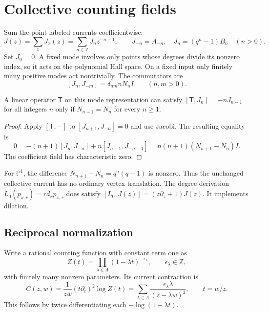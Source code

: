 \section{Collective counting fields}
\label{v4-arith:curve:sec:counting}

Sum the point-labeled currents coefficientwise:
\[
 J(z)=\sum_xJ_x(z)=\sum_{n\in\mathbb Z}J_nz^{-n-1},
 \qquad J_{-n}=A_{-n},\quad J_n=(q^n-1)B_n\quad(n>0).
\]
Set $J_0=0$. A fixed mode involves only points whose degrees divide
its nonzero index, so it acts on the polynomial Hall space.
On a fixed input only finitely many positive modes act nontrivially.
The commutators are
\begin{equation}\label{v4-arith:curve:eq:counting-commutator}
 [J_n,J_{-m}]=\delta_{nm}nN_nI\qquad(n,m>0).
\end{equation}

\begin{proposition}\label{v4-arith:curve:prop:translation}
A linear operator $\mathsf T$ on this mode representation can
satisfy $[\mathsf T,J_n]=-nJ_{n-1}$ for all integers $n$ only if
$N_{n+1}=N_n$ for every $n\geq1$.
\end{proposition}
\begin{proof}
Apply $[\mathsf T,-]$ to $[J_{n+1},J_{-n}]=0$ and use Jacobi.
The resulting equality is
\[
 0=-(n+1)[J_n,J_{-n}]+n[J_{n+1},J_{-n-1}]
   =n(n+1)(N_{n+1}-N_n)I.
\]
The coefficient field has characteristic zero.
\end{proof}

For $\mathbb P^1$, the difference $N_{n+1}-N_n=q^n(q-1)$
is nonzero. Thus the unchanged collective current has no ordinary
vertex translation. The degree derivation
$L_0(p_{x,r})=rd_xp_{x,r}$ does satisfy
$[L_0,J(z)]=(z\partial_z+1)J(z)$.
It implements dilation.

\subsection{Reciprocal normalization}

Write a rational counting function with constant term one as
\[
 Z(t)=\prod_{\lambda\in\Lambda}(1-\lambda t)^{-\epsilon_\lambda},
 \qquad \epsilon_\lambda\in\mathbb Z,
\]
with finitely many nonzero parameters. Its current contraction is
\begin{equation}\label{v4-arith:curve:eq:counting-kernel}
 C(z,w)=\frac1{zw}(t\partial_t)^2\log Z(t)
       =\sum_{\lambda\in\Lambda}
           \frac{\epsilon_\lambda\lambda}{(z-\lambda w)^2},
 \qquad t=w/z.
\end{equation}
This follows by twice differentiating each
$-\log(1-\lambda t)$.

